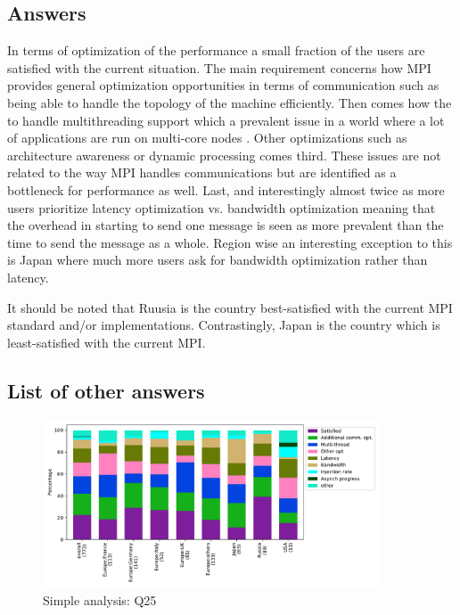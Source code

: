 
\subsection{Answers}


In terms of optimization of the performance a small fraction of the users
are satisfied with the current situation. The main requirement concerns how MPI
provides general optimization opportunities in terms of communication such as
being able to handle the topology of the machine efficiently. Then comes how the
to handle multithreading support which a prevalent issue in a world where a
lot of applications are run on multi-core nodes . Other optimizations such as architecture awareness or dynamic
processing comes third. These issues are not related to the way MPI handles
communications but are identified as a bottleneck for performance as well. Last,
and interestingly almost twice as more users prioritize latency
optimization vs. bandwidth optimization meaning that the overhead in starting to
send one message is seen as more prevalent than the time to send the message as
a whole. Region wise an interesting exception to this is Japan where much more
users ask for bandwidth optimization rather than
latency. 

It should be noted that Ruusia is the country best-satisfied with the
current MPI standard and/or implementations. Contrastingly, Japan is
the country which is least-satisfied with the current MPI.


\subsection{List of other answers}
\begin{itemize}

\end{itemize}

\begin{figure}[htb]
\begin{center}
\includegraphics[width=10cm]{../pdfs/Q25.pdf}
\caption{Simple analysis: Q25}
\label{fig:Q25}
\end{center}
\end{figure}

